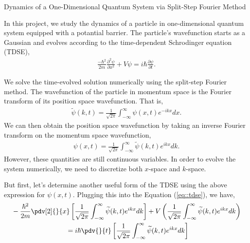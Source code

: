 \documentclass{booknotes}
\begin{document}
	\begin{center}
	\Large{
	Dynamics of a One-Dimensional Quantum System via Split-Step Fourier Method } 
	\end{center}
	
In this project, we study the dynamics of a particle in one-dimensional quantum system equipped with a potantial barrier.
The particle's wavefunction starts as a Gaussian and evolves according to the time-dependent Schrodinger equation (TDSE),
	\begin{align}
	\label{eq::tdse}
	\frac { - \hbar ^ { 2 } } { 2 m } \frac { \partial ^ { 2 } \psi } { \partial x ^ { 2 } } + V \psi  =
	i \hbar \frac { \partial \psi } { \partial t }.
	\end{align}


We solve the time-evolved solution numerically using the split-step Fourier method.
The wavefunction of the particle in momentum space is the Fourier transform of its position space wavefunction.
That is,
	\begin{align}
	\widetilde { \psi } ( k , t ) = \frac { 1 } { \sqrt { 2 \pi } } \int _ { - \infty } ^ { \infty } \psi ( x , t ) e ^ { - i k x } d x.
	\end{align}
We can then obtain the position space wavefunction by taking an inverse Fourier transform on the momentum space wavefunction, 
	\begin{align}
	\psi ( x , t ) = \frac { 1 } { \sqrt { 2 \pi } } \int _ { - \infty } ^ { \infty } \widetilde { \psi } ( k , t ) e ^ { i k x } d k.
	\end{align}
However, these quantities are still continuous variables. In order to evolve the system numerically, we need to discretize both $x$-space and $k$-space.

But first, let's determine another useful form of the TDSE using the above expression for $\psi(x,t)$.
Plugging this into the Equation (\ref{eq::tdse}), we have,
	\begin{align}
	&-\frac { \hbar ^ { 2 } } { 2 m } \pdv[2]{}{x}
	\left[ \frac { 1 } { \sqrt { 2 \pi } } \int _ { - \infty } ^ { \infty } \widetilde { \psi } ( k , t ) e ^ { i k x } d k \right]
	+ V \left( \frac { 1 } { \sqrt { 2 \pi } } \int _ { - \infty } ^ { \infty } \widetilde { \psi } ( k , t ) e ^ { i k x } d k \right) \\
	& \qquad \qquad \qquad \qquad 
	=
	i \hbar \pdv{}{t}
	\left[ \frac { 1 } { \sqrt { 2 \pi } } \int _ { - \infty } ^ { \infty } \widetilde { \psi } ( k , t ) e ^ { i k x } d k \right]\\
	\end{align}
	
\end{document}

